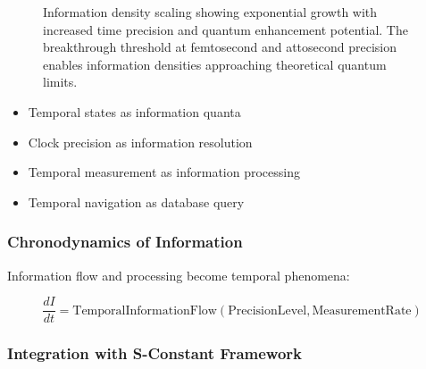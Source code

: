 \documentclass[12pt,a4paper]{article}
\begin{document}
{{{{{{{{{{{{{{\begin{figure}[H]
\caption{Information density scaling showing exponential growth with increased time precision and quantum enhancement potential. The breakthrough threshold at femtosecond and attosecond precision enables information densities approaching theoretical quantum limits.}
\label{fig:information_density_scaling}
\end{figure}

\begin{itemize}
\item Temporal states as information quanta
\item Clock precision as information resolution
\item Temporal measurement as information processing
\item Temporal navigation as database query
\end{itemize}

\subsubsection{Chronodynamics of Information}

Information flow and processing become temporal phenomena:

\begin{equation}
\frac{dI}{dt} = \text{TemporalInformationFlow}(\text{PrecisionLevel}, \text{MeasurementRate})
\end{equation}

\subsubsection{Integration with S-Constant Framework}

}}}}}}}}}}}}}}
\end{document}
